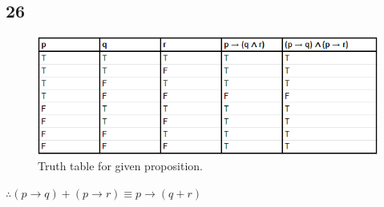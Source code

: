 \documentclass[journal]{IEEEtran}
\begin{document}
		\subsection*{26 }

		\begin{figure}[H]
			\includegraphics[scale = 0.55]{26.PNG}
			\caption{Truth table for given proposition.}
		\end{figure}

		$\therefore \boxed{(p \rightarrow q) + (p \rightarrow r) \equiv p \rightarrow (q + r)}$
\end{document}
